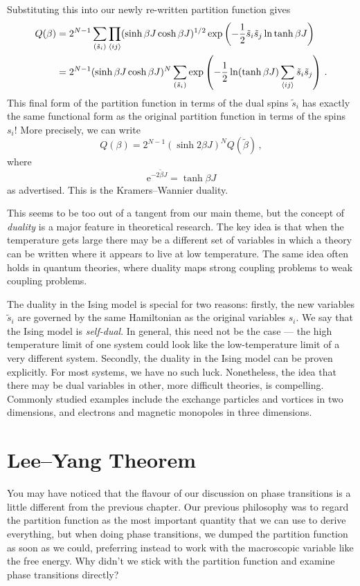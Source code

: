 \documentclass{article}
\theoremstyle{plain}\theoremheaderfont{\normalfont\bfseries}\theorembodyfont{\rmfamily}\theoremseparator{.}\newtheorem*{thm}{Theorem}\newtheorem*{law}{Law}\newtheorem*{pos}{Postulate}
\numberwithin{equation}{section}
\newcommand{\ee}{\mathrm{e}}
\begin{document}
    Substituting this into our newly re-written partition function gives
    \begin{align}
        Q(\beta)&=2^{N-1}\sum_{(\tilde{s}_i)}\prod_{\langle ij\rangle}(\sinh\beta J\cosh\beta J)^{1/2}\exp\left(-\frac{1}{2}\tilde{s}_i\tilde{s}_j\ln\tanh\beta J\right)\notag \\
        &=2^{N-1}(\sinh\beta J\cosh\beta J)^{N}\sum_{(\tilde{s}_i)}\exp\left(-\frac{1}{2}\ln(\tanh\beta J)\sum_{\langle ij\rangle}\tilde{s}_i\tilde{s}_j\right)\,.
    \end{align}
    This final form of the partition function in terms of the dual spins \(\tilde{s}_i\) has exactly the same functional form as the original partition function in terms of the spins \(s_i\)! More precisely, we can write
    \begin{equation}
        Q(\beta)=2^{N-1}(\sinh 2\beta J)^N Q(\tilde{\beta})\,,
    \end{equation}
    where
    \begin{equation}
        \ee^{-2\tilde{\beta}J}=\tanh\beta J
    \end{equation}
    as advertised. This is the Kramers--Wannier duality.

    This seems to be too out of a tangent from our main theme, but the concept of \textit{duality} is a major feature in theoretical research. The key idea is that when the temperature gets large there may be a different set of variables in which a theory can be written where it appears to live at low temperature. The same idea often holds in quantum theories, where duality maps strong coupling problems to weak coupling problems.

    The duality in the Ising model is special for two reasons: firstly, the new variables \(\tilde{s}_i\) are governed by the same Hamiltonian as the original variables \(s_i\). We say that the Ising model is \textit{self-dual}. In general, this need not be the case --- the high temperature limit of one system could look like the low-temperature limit of a very different system. Secondly, the duality in the Ising model can be proven explicitly. For most systems, we have no such luck. Nonetheless, the idea that there may be dual variables in other, more difficult theories, is compelling. Commonly studied examples include the exchange particles and vortices in two dimensions, and electrons and magnetic monopoles in three dimensions.

    \section{Lee--Yang Theorem}
    You may have noticed that the flavour of our discussion on phase transitions is a little different from the previous chapter. Our previous philosophy was to regard the partition function as the most important quantity that we can use to derive everything, but when doing phase transitions, we dumped the partition function as soon as we could, preferring instead to work with the macroscopic variable like the free energy. Why didn't we stick with the partition function and examine phase transitions directly?
\end{document}
